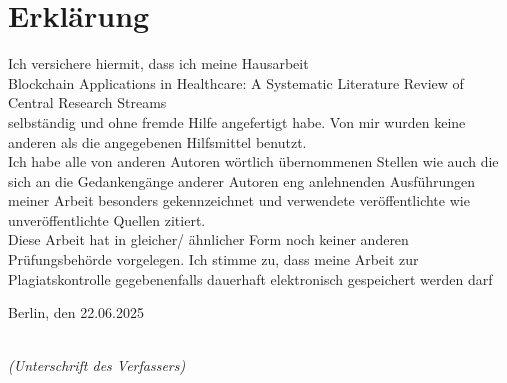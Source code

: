 \chapter{Erklärung}

\thispagestyle{empty}

\begin{large}

\noindent
Ich versichere hiermit, dass ich meine Hausarbeit \\[15mm] %
Blockchain Applications in Healthcare: A Systematic Literature Review of Central Research Streams\\[15mm] %
selbständig und ohne fremde Hilfe angefertigt habe. Von mir wurden keine anderen als die angegebenen
Hilfsmittel benutzt.\\
Ich habe alle von anderen Autoren wörtlich übernommenen Stellen wie auch die sich an die Gedankengänge
anderer Autoren eng anlehnenden Ausführungen meiner Arbeit besonders gekennzeichnet
und verwendete veröffentlichte wie unveröffentlichte Quellen zitiert.\\
Diese Arbeit hat in gleicher/ ähnlicher Form noch keiner anderen Prüfungsbehörde vorgelegen.
Ich stimme zu, dass meine Arbeit zur Plagiatskontrolle gegebenenfalls dauerhaft elektronisch gespeichert
werden darf

\vspace{2cm}

\noindent
Berlin, den 22.06.2025%

\vspace{2cm}

\hspace*{6cm}%
\dotfill\\
\hspace*{8.5cm}%
\textit{(Unterschrift des Verfassers)}

\end{large}
